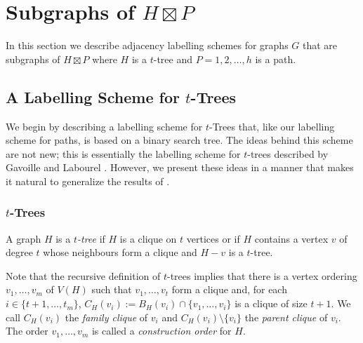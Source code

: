 \documentclass[kpfonts]{patmorin}
\begin{document}
\section{Subgraphs of $H\boxtimes P$}

In this section we describe adjacency labelling schemes for graphs $G$ that are subgraphs of $H\boxtimes P$ where $H$ is a $t$-tree and $P=1,2,\ldots,h$ is a path.  


\subsection{A Labelling Scheme for $t$-Trees}

We begin by describing a labelling scheme for $t$-Trees that, like our labelling scheme for paths, is based on a binary search tree.  The ideas behind this scheme are not new; this is essentially the labelling scheme for $t$-trees described by Gavoille and Labourel \cite{gavoille.labourel:shorter}.  However, we present these ideas in a manner that makes it natural to generalize the results of .

\subsubsection{$t$-Trees}

A graph $H$ is a \emph{$t$-tree} if $H$ is a clique on $t$ vertices or if $H$ contains a vertex $v$ of degree $t$ whose neighbours form a clique and $H-v$ is a $t$-tree.  

Note that the recursive definition of $t$-trees implies that there is a vertex ordering $v_1,\ldots,v_{m}$ of $V(H)$ such that $v_1,\ldots,v_t$ form a clique and, for each $i\in\{t+1,\ldots,t_m\}$, $C_H(v_i):=B_H(v_i)\cap \{v_1,\ldots,v_{i}\}$ is a clique of size $t+1$.  We call $C_H(v_i)$ the \emph{family clique} of $v_i$ and $C_H(v_i)\setminus\{v_i\}$ the \emph{parent clique} of $v_i$.  The order $v_1,\ldots,v_m$ is called a \emph{construction order} for $H$.
\end{document}

